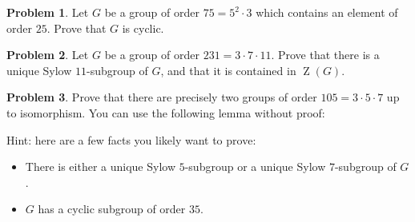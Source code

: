 \documentclass[11pt]{article}
\theoremstyle{definition}
\newtheorem{problem}{Problem}
\begin{document}
\begin{problem}
	Let $G$ be a group of order $75 = 5^2 \cdot 3$ which contains an element of order $25$. Prove that $G$ is cyclic.
\end{problem}



\begin{problem}
Let $G$ be a group of order $231 = 3\cdot 7\cdot 11$.  Prove that there is a unique Sylow $11$-subgroup of $G$, and that it is contained in $\operatorname{Z}(G)$.
\end{problem}




\begin{problem}
Prove that there are precisely two groups of order $105 = 3 \cdot 5 \cdot 7$ up to isomorphism. You can use the following lemma without proof:

\noindent
Hint: here are a few facts you likely want to prove:

\vspace{-0.5em}
\begin{itemize}[itemsep=-0.2em]
	\item There is either a unique Sylow $5$-subgroup or a unique Sylow $7$-subgroup of $G$. 

\item $G$ has a cyclic subgroup of order $35$.
\end{itemize}
\end{problem}
\end{document}
